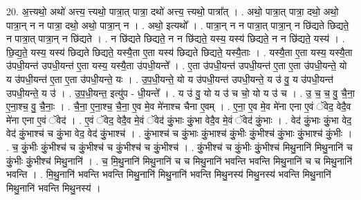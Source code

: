 \documentclass[17pt]{extarticle}
\begin{document}
20. अ॒त्त्यथो॒ अथो॑ अत्त्य॒ त्त्यथो॒ पात्रा॒त् पात्रा॒ दथो॑ अत्त्य॒ त्त्यथो॒ पात्रा᳚त् । . अथो॒ पात्रा॒त् पात्रा॒ दथो॒ अथो॒ पात्रा॒न् न न पात्रा॒ दथो॒ अथो॒ पात्रा॒न् न । . अथो॒ इत्यथो᳚ । . पात्रा॒न् न न पात्रा॒त् पात्रा॒न् न छि॑द्यते छिद्यते॒ न पात्रा॒त् पात्रा॒न् न छि॑द्यते । . न छि॑द्यते छिद्यते॒ न न छि॑द्यते॒ यस्य॒ यस्य॑ छिद्यते॒ न न छि॑द्यते॒ यस्य॑ । . छि॒द्य॒ते॒ यस्य॒ यस्य॑ छिद्यते छिद्यते॒ यस्यै॒ता ए॒ता यस्य॑ छिद्यते छिद्यते॒ यस्यै॒ताः । . यस्यै॒ता ए॒ता यस्य॒ यस्यै॒ता उ॑पधी॒यन्त॑ उपधी॒यन्त॑ ए॒ता यस्य॒ यस्यै॒ता उ॑पधी॒यन्ते᳚ । . ए॒ता उ॑पधी॒यन्त॑ उपधी॒यन्त॑ ए॒ता ए॒ता उ॑पधी॒यन्ते॒ यो य उ॑पधी॒यन्त॑ ए॒ता ए॒ता उ॑पधी॒यन्ते॒ यः । . उ॒प॒धी॒यन्ते॒ यो य उ॑पधी॒यन्त॑ उपधी॒यन्ते॒ य उ॑ वु॒ य उ॑पधी॒यन्त॑ उपधी॒यन्ते॒ य उ॑ । . उ॒प॒धी॒यन्त॒ इत्यु॑प - धी॒यन्ते᳚ । . य उ॑ वु॒ यो य उ॑ च चो॒ यो य उ॑ च । . उ॒ च॒ च॒ वु॒ चै॒ना॒ ए॒ना॒श्च॒ वु॒ चै॒नाः॒ । . चै॒ना॒ ए॒ना॒श्च॒ चै॒ना॒ ए॒व मे॒व मे॑नाश्च चैना ए॒वम् । . ए॒ना॒ ए॒व मे॒व मे॑ना एना ए॒वं ॅवेद॒ वेदै॒व मे॑ना एना ए॒वं ॅवेद॑ । . ए॒वं ॅवेद॒ वेदै॒व मे॒वं ॅवेद॑ कुं॒भाः कुं॒भा वेदै॒व मे॒वं ॅवेद॑ कुं॒भाः । . वेद॑ कुं॒भाः कुं॒भा वेद॒ वेद॑ कुं॒भाश्च॑ च कुं॒भा वेद॒ वेद॑ कुं॒भाश्च॑ । . कुं॒भाश्च॑ च कुं॒भाः कुं॒भाश्च॑ कुं॒भीः कुं॒भीश्च॑ कुं॒भाः कुं॒भाश्च॑ कुं॒भीः । . च॒ कुं॒भीः कुं॒भीश्च॑ च कुं॒भीश्च॑ च कुं॒भीश्च॑ च कुं॒भीश्च॑ । . कुं॒भीश्च॑ च कुं॒भीः कुं॒भीश्च॑ मिथु॒नानि॑ मिथु॒नानि॑ च कुं॒भीः कुं॒भीश्च॑ मिथु॒नानि॑ । . च॒ मि॒थु॒नानि॑ मिथु॒नानि॑ च च मिथु॒नानि॑ भवन्ति भवन्ति मिथु॒नानि॑ च च मिथु॒नानि॑ भवन्ति । . मि॒थु॒नानि॑ भवन्ति भवन्ति मिथु॒नानि॑ मिथु॒नानि॑ भवन्ति मिथु॒नस्य॑ मिथु॒नस्य॑ भवन्ति मिथु॒नानि॑ मिथु॒नानि॑ भवन्ति मिथु॒नस्य॑ । \newline
\end{document}
